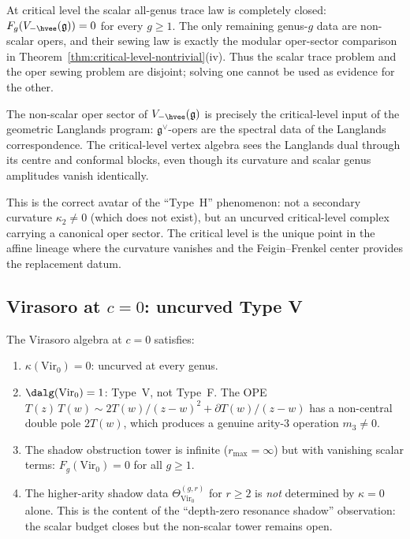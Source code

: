 \documentclass[11pt]{article}
\newcommand{\fg}{\mathfrak{g}}
\begin{document}
\begin{corollary}
\label{cor:critical-level-all-genus-trace-boundary}
At critical level the scalar all-genus trace law is completely
closed: $F_g(V_{-\hvee}(\fg))=0$ for every $g\ge1$.  The only
remaining genus-$g$ data are non-scalar opers, and their sewing
law is exactly the modular oper-sector comparison in
Theorem~\ref{thm:critical-level-nontrivial}\textup{(iv)}.  Thus
the scalar trace problem and the oper sewing problem are
disjoint; solving one cannot be used as evidence for the other.
\end{corollary}

\begin{remark}
\label{rem:critical-langlands}
The non-scalar oper sector of $V_{-\hvee}(\fg)$ is precisely
the critical-level input of the geometric Langlands program:
$\fg^\vee$-opers are the spectral data of the Langlands
correspondence.  The critical-level vertex algebra sees the
Langlands dual through its centre and conformal blocks, even
though its curvature and scalar genus amplitudes vanish
identically.

This is the correct avatar of the ``Type~H'' phenomenon:
not a secondary curvature $\kappa_2 \neq 0$ (which does not
exist), but an uncurved critical-level complex carrying a
canonical oper sector.  The critical level is the unique point
in the affine lineage where the curvature vanishes and the
Feigin--Frenkel center provides the replacement datum.
\end{remark}

\subsection{Virasoro at $c = 0$: uncurved Type V}

\begin{proposition}
\label{prop:vir-0-uncurved}
The Virasoro algebra at $c = 0$ satisfies:
\begin{enumerate}[label=\textup{(\roman*)}]
\item $\kappa(\mathrm{Vir}_0) = 0$: uncurved at every genus.
\item $\dalg(\mathrm{Vir}_0) = 1$: Type~V, not Type~F.
  The OPE $T(z)\,T(w) \sim 2T(w)/(z-w)^2 + \partial T(w)/(z-w)$
  has a non-central double pole $2T(w)$, which produces
  a genuine arity-$3$ operation $m_3 \neq 0$.
\item The shadow obstruction tower is infinite ($r_{\max} = \infty$)
  but with vanishing scalar terms: $F_g(\mathrm{Vir}_0) = 0$
  for all $g \geq 1$.
\item The higher-arity shadow data
  $\Theta^{(g,r)}_{\mathrm{Vir}_0}$ for $r \geq 2$ is
  \emph{not} determined by $\kappa = 0$ alone.
  This is the content of the ``depth-zero resonance shadow''
  observation: the scalar budget closes but the non-scalar
  tower remains open.
\end{enumerate}
\end{proposition}
\end{document}
